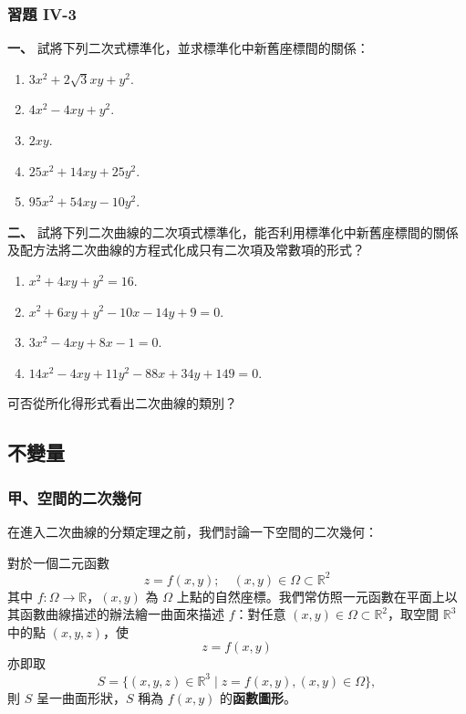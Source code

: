 \subsubsection*{習題 IV-3}

\textbf{一、} 試將下列二次式標準化，並求標準化中新舊座標間的關係：
\begin{enumerate}
  \item $3x^2 + 2\sqrt{3}xy + y^2$.
  \item $4x^2 - 4xy + y^2$.
  \item $2xy$.
  \item $25x^2 + 14xy + 25y^2$.
  \item $95x^2 + 54xy - 10y^2$.
\end{enumerate}

\textbf{二、} 試將下列二次曲線的二次項式標準化，能否利用標準化中新舊座標間的關係及配方法將二次曲線的方程式化成只有二次項及常數項的形式？
\begin{enumerate}
  \item $x^2 + 4xy + y^2 = 16$.
  \item $x^2 + 6xy + y^2 - 10x - 14y + 9 = 0$.
  \item $3x^2 - 4xy + 8x - 1 = 0$.
  \item $14x^2 - 4xy + 11y^2 - 88x + 34y + 149 = 0$.
\end{enumerate}
可否從所化得形式看出二次曲線的類別？


\subsection{不變量}\label{sec:b4-4-4}

\subsubsection*{甲、\quad 空間的二次幾何}

在進入二次曲線的分類定理之前，我們討論一下空間的二次幾何：

對於一個二元函數
\begin{equation}
z = f(x, y); \quad (x, y) \in \Omega \subset \mathbb{R}^2
\label{eq:b4-ch4-surface-func}
\end{equation}
其中 $f: \Omega \to \mathbb{R}$，$(x, y)$ 為 $\Omega$ 上點的自然座標。我們常仿照一元函數在平面上以其函數曲線描述的辦法繪一曲面來描述 $f$：對任意 $(x, y) \in \Omega \subset \mathbb{R}^2$，取空間 $\mathbb{R}^3$ 中的點 $(x, y, z)$，使
\[
z = f(x, y)
\]
亦即取
\[
S = \{ (x, y, z) \in \mathbb{R}^3 \mid z = f(x, y), (x, y) \in \Omega \},
\]
則 $S$ 呈一曲面形狀，$S$ 稱為 $f(x, y)$ 的\textbf{函數圖形}。

